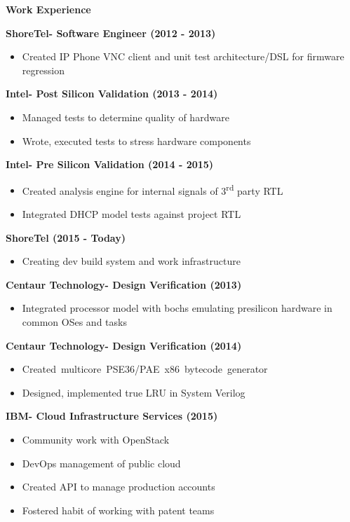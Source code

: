 \documentclass{report}
\begin{document}
\textbf{Work Experience} \\
\begin{paracol}{2}
  \textbf{ShoreTel- Software Engineer (2012 - 2013)}
  \begin{itemize}[label=$\circ$]
  \item Created IP Phone VNC client and unit test architecture/DSL for firmware
    regression
  \end{itemize}

  \textbf{Intel- Post Silicon Validation (2013 - 2014)}
  \begin{itemize}[label=$\circ$]
  \item Managed tests to determine quality of hardware
  \item Wrote, executed tests to stress hardware components
  \end{itemize}
  
  \textbf{Intel- Pre Silicon Validation (2014 - 2015)}
  \begin{itemize}[label=$\circ$]
  \item Created analysis engine for internal signals of 3\textsuperscript{rd} party RTL
  \item Integrated DHCP model tests against project RTL
  \end{itemize}

  \textbf{ShoreTel (2015 - Today)}
  \begin{itemize}[label=$\circ$]
  \item Creating dev build system and work infrastructure
  \end{itemize}

  \switchcolumn{}
  \textbf{Centaur Technology- Design Verification (2013)}
  \begin{itemize}[label=$\circ$]
  \item Integrated processor model with bochs emulating presilicon hardware
    in common OSes and tasks
  \end{itemize}

  \textbf{Centaur Technology- Design Verification (2014)}
  \begin{itemize}[label=$\circ$]
  \item \mbox{Created multicore PSE36/PAE x86 bytecode generator}
  \item Designed, implemented true LRU in System Verilog
  \end{itemize}
  
  \textbf{IBM- Cloud Infrastructure Services (2015)}
  \begin{itemize}[label=$\circ$]
  \item Community work with OpenStack
  \item DevOps management of public cloud
  \item Created API to manage production accounts
  \item Fostered habit of working with patent teams
  \end{itemize}
\end{paracol}
\end{document}
